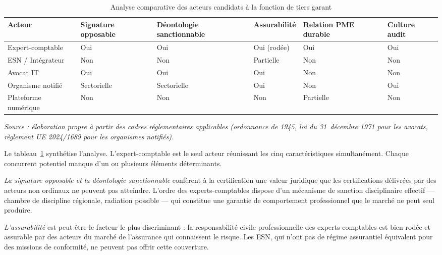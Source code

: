 \documentclass[12pt,a4paper]{article}
\begin{document}
\begin{table}[h!]
\centering
\caption{Analyse comparative des acteurs candidats à la fonction de tiers garant}
\label{tab:comparatif}
\footnotesize
\begin{tabularx}{\textwidth}{%
  l
  >{\centering\arraybackslash}X
  >{\centering\arraybackslash}X
  >{\centering\arraybackslash}X
  >{\centering\arraybackslash}X
  >{\centering\arraybackslash}X}
\toprule
\textbf{Acteur} & \textbf{Signature opposable} & \textbf{Déontologie sanctionnable} & \textbf{Assurabilité} & \textbf{Relation PME durable} & \textbf{Culture audit} \\
\midrule
Expert-comptable & Oui & Oui & Oui (rodée) & Oui & Oui \\
\addlinespace
ESN / Intégrateur & Non & Non & Partielle & Non & Non \\
\addlinespace
Avocat IT & Oui & Oui & Oui & Non & Non \\
\addlinespace
Organisme notifié & Sectorielle & Sectorielle & Oui & Non & Oui \\
\addlinespace
Plateforme numérique & Non & Non & Non & Partielle & Non \\
\bottomrule
\end{tabularx}

\par\vspace{0.4em}
\noindent\small\textit{Source : élaboration propre à partir des cadres réglementaires applicables
(ordonnance de 1945, loi du 31~décembre 1971 pour les avocats,
règlement UE 2024/1689 pour les organismes notifiés).}
\end{table}

Le tableau~\ref{tab:comparatif} synthétise l'analyse. L'expert-comptable est le seul acteur réunissant les cinq caractéristiques simultanément. Chaque concurrent potentiel manque d'un ou plusieurs éléments déterminants.

\textit{La signature opposable et la déontologie sanctionnable} confèrent à la certification une valeur juridique que les certifications délivrées par des acteurs non ordinaux ne peuvent pas atteindre. L'ordre des experts-comptables dispose d'un mécanisme de sanction disciplinaire effectif — chambre de discipline régionale, radiation possible — qui constitue une garantie de comportement professionnel que le marché ne peut seul produire.

\textit{L'assurabilité} est peut-être le facteur le plus discriminant : la responsabilité civile professionnelle des experts-comptables est bien rodée et assurable par des acteurs du marché de l'assurance qui connaissent le risque. Les ESN, qui n'ont pas de régime assurantiel équivalent pour des missions de conformité, ne peuvent pas offrir cette couverture.
\end{document}
